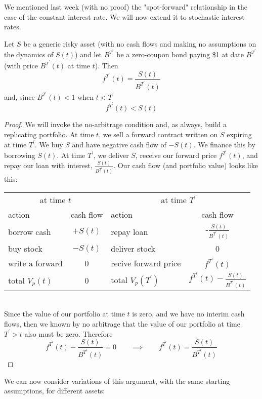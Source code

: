 \documentclass[11pt]{article}
\begin{document}
We mentioned last week (with no proof) the "spot-forward" relationship in the case of the constant interest rate. We will now extend it to stochastic interest rates. 
\begin{theorem}
Let $S$ be a generic risky asset (with no cash flows and making no assumptions on the dynamics of $S(t)$) and let $B^{T^\prime}$ be a zero-coupon bond paying \$1 at date $B^{T^\prime}$ (with price $B^{T^\prime}(t)$ at time $t$). Then
$$ f^{T^\prime}(t) = \frac{S(t)}{B^{T^\prime}(t)}$$
and, since $B^{T^\prime}(t) < 1$ when $t < T^\prime$
$$ f^{T^\prime}(t) < S(t)$$ 
\end{theorem}
\begin{proof}
We will invoke the no-arbitrage condition and, as always, build a replicating portfolio. At time $t$, we sell a forward contract written on $S$ expiring at time $T^\prime$. We buy $S$ and have negative cash flow of $-S(t)$. We finance this by borrowing $S(t)$.  At time $T^\prime$, we deliver $S$, receive our forward price $f^{T^\prime}(t)$, and repay our loan with interest, $\frac{S(t)}{B^{T^\prime}(t)}$.  Our cash flow (and portfolio value) looks like this: \\

\begin{tabular}{l | c | l | c }
\multicolumn{2}{c|}{at time $t$} & \multicolumn{2}{c}{at time $T^\prime$} \\
action & cash flow & action & cash flow  \\
\hline
borrow cash & $+S(t)$  & repay loan & -$\frac{S(t)}{B^{T^\prime}(t)}$  \\
buy stock & $-S(t)$ & deliver stock & 0\\
write a forward & 0 & recive forward price & $f^{T^\prime}(t)$ \\
\hline
total $V_p(t)$ & 0 & total $V_p(T^\prime)$ & $f^{T^\prime}(t) - \frac{S(t)}{B^{T^\prime}(t)}$ \\
\end{tabular}\\

Since the value of our portfolio at time $t$ is zero, and we have no interim cash flows, then we known by no arbitrage that the value of our portfolio at time $T^\prime > t$ also must be zero. Therefore
$$f^{T^\prime}(t) - \frac{S(t)}{B^{T^\prime}(t)} = 0 \qquad \implies \qquad f^{T^\prime}(t) = \frac{S(t)}{B^{T^\prime}(t)}$$
\end{proof} 

We can now consider variations of this argument, with the same starting assumptions, for different assets:\\
\end{document}
